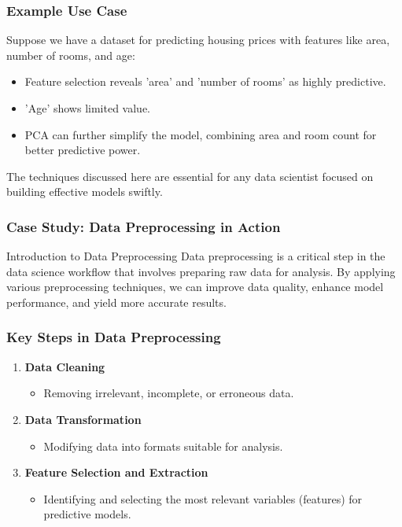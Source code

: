 \documentclass[aspectratio=169]{beamer}
\begin{document}
\begin{frame}[fragile]
    \frametitle{Example Use Case}
    Suppose we have a dataset for predicting housing prices with features like area, number of rooms, and age:
    \begin{itemize}
        \item Feature selection reveals 'area' and 'number of rooms' as highly predictive.
        \item 'Age' shows limited value.
        \item PCA can further simplify the model, combining area and room count for better predictive power.
    \end{itemize}

    The techniques discussed here are essential for any data scientist focused on building effective models swiftly.
\end{frame}

\begin{frame}
    \frametitle{Case Study: Data Preprocessing in Action}
    \begin{block}{Introduction to Data Preprocessing}
        Data preprocessing is a critical step in the data science workflow that involves preparing raw data for analysis. 
        By applying various preprocessing techniques, we can improve data quality, enhance model performance, and yield more accurate results.
    \end{block}
\end{frame}

\begin{frame}
    \frametitle{Key Steps in Data Preprocessing}
    \begin{enumerate}
        \item \textbf{Data Cleaning}
            \begin{itemize}
                \item Removing irrelevant, incomplete, or erroneous data.
            \end{itemize}
        \item \textbf{Data Transformation}
            \begin{itemize}
                \item Modifying data into formats suitable for analysis.
            \end{itemize}
        \item \textbf{Feature Selection and Extraction}
            \begin{itemize}
                \item Identifying and selecting the most relevant variables (features) for predictive models.
            \end{itemize}
    \end{enumerate}
\end{frame}
\end{document}
